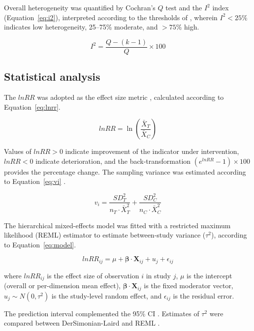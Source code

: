 \documentclass[12pt,a4paper]{article}
\begin{document}
Overall heterogeneity was quantified by Cochran's $Q$ test and the $I^2$ index (Equation~\ref{eq:i2}), interpreted according to the thresholds of \citet{Higgins2003}, wherein $I^2 < 25\%$ indicates low heterogeneity, 25--75\% moderate, and $> 75\%$ high.

\begin{equation}
I^2 = \frac{Q - (k-1)}{Q} \times 100
\label{eq:i2}
\end{equation}

\subsection{Statistical analysis}
\label{sec:stats}

The $lnRR$ was adopted as the effect size metric \citep{Hedges1999}, calculated according to Equation~\ref{eq:lnrr}.

\begin{equation}
lnRR = \ln\left(\frac{\bar{X}_{T}}{\bar{X}_{C}}\right)
\label{eq:lnrr}
\end{equation}

\noindent Values of $lnRR > 0$ indicate improvement of the indicator under intervention, $lnRR < 0$ indicate deterioration, and the back-transformation $(e^{lnRR} - 1) \times 100$ provides the percentage change. The sampling variance was estimated according to Equation~\ref{eq:vi} \citep{Hedges1999}.

\begin{equation}
v_i = \frac{SD_T^2}{n_T \cdot \bar{X}_T^2} + \frac{SD_C^2}{n_C \cdot \bar{X}_C^2}
\label{eq:vi}
\end{equation}

The hierarchical mixed-effects model was fitted with a restricted maximum likelihood (REML) estimator to estimate between-study variance ($\tau^2$), according to Equation~\ref{eq:model}.

\begin{equation}
lnRR_{ij} = \mu + \bm{\beta} \cdot \mathbf{X}_{ij} + u_j + \epsilon_{ij}
\label{eq:model}
\end{equation}

\noindent where $lnRR_{ij}$ is the effect size of observation $i$ in study $j$, $\mu$ is the intercept (overall or per-dimension mean effect), $\bm{\beta} \cdot \mathbf{X}_{ij}$ is the fixed moderator vector, $u_j \sim N(0, \tau^2)$ is the study-level random effect, and $\epsilon_{ij}$ is the residual error.

The prediction interval complemented the 95\% CI \citep{IntHout2016}. Estimates of $\tau^2$ were compared between DerSimonian-Laird and REML \citep{Borenstein2009}.
\end{document}
